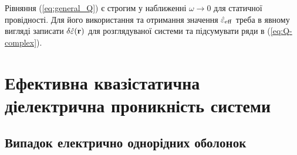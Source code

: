 \documentclass[14pt,twoside]{vakthesis}
\newcommand{\colrr}{\color{red}}
\begin{document}
Рівняння (\ref{eq:general_Q}) є строгим у наближенні $\omega \to 0$ для статичної провідності. Для його використання та отримання значення $\hat{\varepsilon}_{\rm eff}$ треба в явному вигляді записати $\delta\hat{\varepsilon}({\bf r})$ для розглядуваної системи та підсумувати ряди в (\ref{eq:Q-complex}).


\section{Ефективна квазістатична діелектрична проникність 
	системи}


\subsection{Випадок електрично однорідних оболонок}
\end{document}
